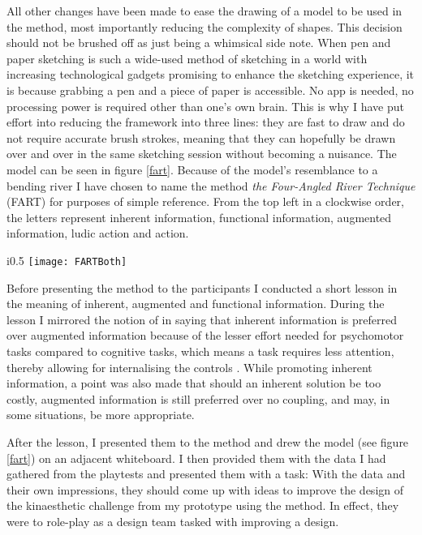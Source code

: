 All other changes have been made to ease the drawing of a model to be used in the method, most importantly reducing the complexity of shapes. This decision should not be brushed off as just being a whimsical side note. When pen and paper sketching is such a wide-used method of sketching in a world with increasing technological gadgets promising to enhance the sketching experience, it is because grabbing a pen and a piece of paper is accessible. No app is needed, no processing power is required other than one's own brain. This is why I have put effort into reducing the framework into three lines: they are fast to draw and do not require accurate brush strokes, meaning that they can hopefully be drawn over and over in the same sketching session without becoming a nuisance. The model can be seen in figure \ref{fart}. Because of the model's resemblance to a bending river I have chosen to name the method \textit{the Four-Angled River Technique} (FART) for purposes of simple reference. From the top left in a clockwise order, the letters represent inherent information, functional information, augmented information, ludic action and action.

\begin{wrapfigure}{i}{0.5\textwidth}
  \texttt{[image: FARTBoth]}
  \caption{The Four-Angled River Technique. Above is the formal form and below is how it could look in practice}
  \label{fart}
\end{wrapfigure}

Before presenting the method to the participants I conducted a short lesson in the meaning of inherent, augmented and functional information. During the lesson I mirrored the notion of  in saying that inherent information is preferred over augmented information because of the lesser effort needed for psychomotor tasks compared to cognitive tasks, which means a task requires less attention, thereby allowing for internalising the controls \cite{calleja}. While promoting inherent information, a point was also made that should an inherent solution be too costly, augmented information is still preferred over no coupling, and may, in some situations, be more appropriate.

After the lesson, I presented them to the method and drew the model (see figure \ref{fart}) on an adjacent whiteboard. I then provided them with the data I had gathered from the playtests and presented them with a task: With the data and their own impressions, they should come up with ideas to improve the design of the kinaesthetic challenge from my prototype using the method. In effect, they were to role-play as a design team tasked with improving a design.

